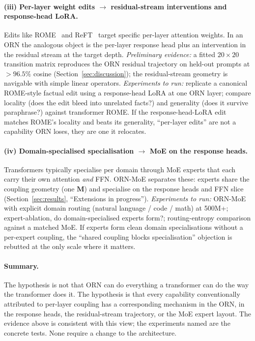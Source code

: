 \documentclass[10pt,twocolumn]{article}
\newcommand{\M}{\mathbf{M}}
\begin{document}
\paragraph{(iii) Per-layer weight edits $\to$ residual-stream interventions and response-head LoRA.}
Edits like ROME~\cite{meng2022rome} and ReFT~\cite{wu2024reft} target specific per-layer attention weights.
In an ORN the analogous object is the per-layer response head plus an intervention in the residual stream at the target depth.
\textit{Preliminary evidence:} a fitted $20 \times 20$ transition matrix reproduces the ORN residual trajectory on held-out prompts at $>96.5\%$ cosine (Section~\ref{sec:discussion}); the residual-stream geometry is navigable with simple linear operators.
\textit{Experiments to run:} replicate a canonical ROME-style factual edit using a response-head LoRA at one ORN layer; compare locality (does the edit bleed into unrelated facts?) and generality (does it survive paraphrase?) against transformer ROME. If the response-head-LoRA edit matches ROME's locality and beats its generality, ``per-layer edits'' are not a capability ORN loses, they are one it relocates.

\paragraph{(iv) Domain-specialised specialisation $\to$ MoE on the response heads.}
Transformers typically specialise per domain through MoE experts that each carry their own attention \emph{and} FFN.
ORN-MoE separates these: experts share the coupling geometry (one $\M$) and specialise on the response heads and FFN slice (Section~\ref{sec:results}, ``Extensions in progress'').
\textit{Experiments to run:} ORN-MoE with explicit domain routing (natural language / code / math) at 500M+; expert-ablation, do domain-specialised experts form?; routing-entropy comparison against a matched MoE. If experts form clean domain specialisations without a per-expert coupling, the ``shared coupling blocks specialisation'' objection is rebutted at the only scale where it matters.

\paragraph{Summary.}
The hypothesis is not that ORN can do everything a transformer can do the way the transformer does it. The hypothesis is that every capability conventionally attributed to per-layer coupling has a corresponding mechanism in the ORN, in the response heads, the residual-stream trajectory, or the MoE expert layout. The evidence above is consistent with this view; the experiments named are the concrete tests. None require a change to the architecture.
\end{document}
